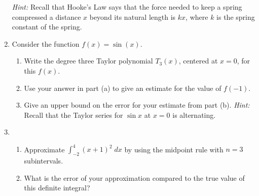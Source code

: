 \documentclass[10pt]{article}
\begin{document}
\begin{enumerate}
\begin{enumerate}
\end{enumerate}

\emph{Hint:} Recall that Hooke's Law says that the force needed to keep a spring compressed a distance $x$ beyond its natural length is $kx$, where $k$ is the spring constant of the spring.

\item Consider the function $f(x) = \sin(x)$.
\begin{enumerate}

\item Write the degree three Taylor polynomial $T_3(x)$, centered at $x=0$, for this $f(x)$. 

\item Use your answer in part (a) to give an estimate for the value of $f(-1)$. 

\item Give an upper bound on the error for your estimate from part (b). \emph{Hint:} Recall that the Taylor series for $\sin x$ at $x=0$ is alternating.


\end{enumerate}

\item
\begin{enumerate}

\item Approximate $\displaystyle \int_{-2}^{4} (x+1)^2 \; dx$ by using the midpoint rule with $n=3$ subintervals. 

\item What is the error of your approximation compared to the true value of this definite integral?

\end{enumerate}

\end{enumerate}
\end{document}
